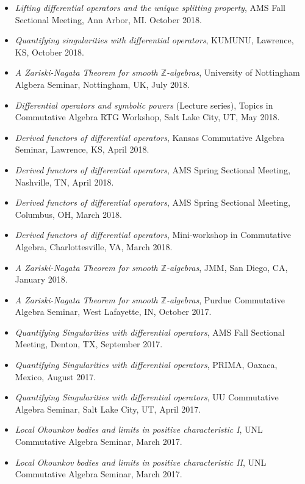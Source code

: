 \documentclass[12pt]{amsart}
\begin{document}
\begin{itemize}[leftmargin=9mm]
	\item \emph{Lifting differential operators and the unique splitting property}, AMS Fall Sectional Meeting, Ann Arbor, MI. October 2018.
	\item \emph{Quantifying singularities with differential operators}, KUMUNU, Lawrence, KS, October 2018.
	\item \emph{A Zariski-Nagata Theorem for smooth $\mathbb{Z}$-algebras}, University of Nottingham Algbera Seminar, Nottingham, UK, July 2018.
	\item \emph{Differential operators and symbolic powers} (Lecture series), Topics in Commutative Algebra RTG Workshop, Salt Lake City, UT, May 2018.
	\item \emph{Derived functors of differential operators}, Kansas Commutative Algebra Seminar, Lawrence, KS, April 2018.
	\item \emph{Derived functors of differential operators}, AMS Spring Sectional Meeting, Nashville, TN, April 2018.
	\item \emph{Derived functors of differential operators}, AMS Spring Sectional Meeting, Columbus, OH, March 2018.
	\item \emph{Derived functors of differential operators}, Mini-workshop in Commutative Algebra, Charlottesville, VA, March 2018.
	\item \emph{A Zariski-Nagata Theorem for smooth $\mathbb{Z}$-algebras}, JMM, San Diego, CA, January 2018.
	
	\item \emph{A Zariski-Nagata Theorem for smooth $\mathbb{Z}$-algebras}, Purdue Commutative Algebra Seminar, West Lafayette, IN, October 2017.
	
	\item \emph{Quantifying Singularities with differential operators}, AMS Fall Sectional Meeting, Denton, TX, September 2017.
	
	\item \emph{Quantifying Singularities with differential operators}, PRIMA, Oaxaca, Mexico, August 2017.
	
	\item \emph{Quantifying Singularities with differential operators}, UU Commutative Algebra Seminar, Salt Lake City, UT, April 2017.

	\item \emph{Local Okounkov bodies and limits in positive characteristic I}, UNL Commutative Algebra Seminar, March 2017.
	
	\item \emph{Local Okounkov bodies and limits in positive characteristic II}, UNL Commutative Algebra Seminar, March 2017.


\end{itemize}
\end{document}
